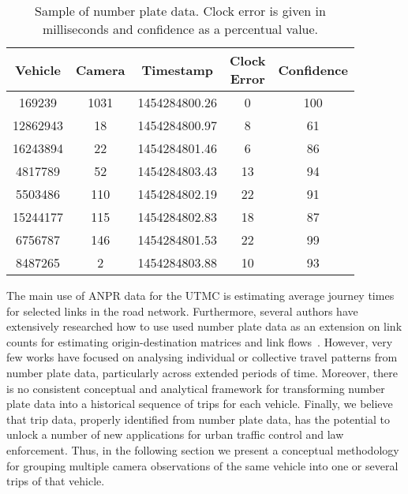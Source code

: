 \begin{table}[ht]
\centering
\tabcolsep=0.17cm
\small
\begin{tabular}{c c c c c}
  \hline
  Vehicle & Camera & Timestamp & \thead{Clock \\Error} & Confidence \\
  \hline
  169239 & 1031 & 1454284800.26 &   0 & 100 \\
  12862943 & 18 & 1454284800.97 &   8 &  61 \\
  16243894 & 22 & 1454284801.46 &   6 &  86 \\
  4817789 & 52 & 1454284803.43 &  13 &  94 \\
  5503486 & 110 & 1454284802.19 &  22 &  91 \\
  15244177 & 115 & 1454284802.83 &  18 &  87 \\
  6756787 & 146 & 1454284801.53 &  22 &  99 \\
  8487265 & 2 & 1454284803.88 &  10 &  93 \\
   \hline
\end{tabular}
\caption{Sample of number plate data. Clock error is given in milliseconds and confidence as a percentual value.}
\label{t:np_data_example}
\end{table}

The main use of ANPR data for the UTMC is estimating average journey times for selected links in the road network. Furthermore, several authors have extensively researched how to use used number plate data as an extension on link counts for estimating origin-destination matrices and link flows~\cite{Castillo2010, Castillo2008, Hazelton2012}. However, very few works have focused on analysing individual or collective travel patterns from number plate data, particularly across extended periods of time. Moreover, there is no consistent conceptual and analytical framework for transforming number plate data into a historical sequence of trips for each vehicle. Finally, we believe that trip data, properly identified from number plate data, has the potential to unlock a number of new applications for urban traffic control and law enforcement. Thus, in the following section we present a conceptual methodology for grouping multiple camera observations of the same vehicle into one or several trips of that vehicle.
